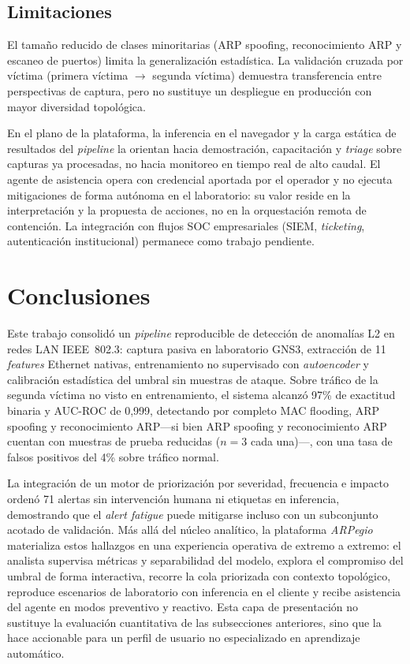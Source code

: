 \documentclass[conference]{IEEEtran}
\newcommand{\arpspoof}{ARP spoofing}
\newcommand{\macflood}{MAC flooding}
\newcommand{\portscan}{escaneo de puertos}
\newcommand{\arprecon}{reconocimiento ARP}
\newcommand{\victimauno}{primera víctima}
\newcommand{\victimados}{segunda víctima}
\begin{document}
\subsection{Limitaciones}
El tamaño reducido de clases minoritarias (\arpspoof,
\arprecon{} y \portscan) limita la generalización
estadística. La validación cruzada por víctima (\victimauno{} $\to$
\victimados) demuestra transferencia entre perspectivas de captura,
pero no sustituye un despliegue en producción con mayor diversidad
topológica.

En el plano de la plataforma, la inferencia en el navegador y la carga
estática de resultados del \textit{pipeline} la orientan hacia demostración,
capacitación y \textit{triage} sobre capturas ya procesadas, no hacia
monitoreo en tiempo real de alto caudal. El agente de asistencia opera
con credencial aportada por el operador y no ejecuta mitigaciones de
forma autónoma en el laboratorio: su valor reside en la interpretación y
la propuesta de acciones, no en la orquestación remota de contención. La
integración con flujos SOC empresariales (SIEM, \textit{ticketing},
autenticación institucional) permanece como trabajo pendiente.

\section{Conclusiones}

Este trabajo consolidó un \textit{pipeline} reproducible de detección de
anomalías L2 en redes LAN IEEE~802.3: captura pasiva en laboratorio GNS3,
extracción de 11 \textit{features} Ethernet nativas, entrenamiento no
supervisado con \textit{autoencoder} y calibración estadística del umbral
sin muestras de ataque. Sobre tráfico de la \victimados{} no visto en
entrenamiento, el sistema alcanzó 97\% de exactitud binaria y AUC-ROC de
0{,}999, detectando por completo \macflood, \arpspoof{} y
\arprecon---si bien \arpspoof{} y \arprecon{}
cuentan con muestras de prueba reducidas ($n=3$ cada una)---, con una
tasa de falsos positivos del 4\% sobre tráfico normal.

La integración de un motor de priorización por severidad, frecuencia e
impacto ordenó 71 alertas sin intervención humana ni etiquetas en
inferencia, demostrando que el \textit{alert fatigue} puede mitigarse
incluso con un subconjunto acotado de validación. Más allá del núcleo
analítico, la plataforma \textit{ARPegio} materializa estos hallazgos en
una experiencia operativa de extremo a extremo: el analista supervisa
métricas y separabilidad del modelo, explora el compromiso del umbral de
forma interactiva, recorre la cola priorizada con contexto topológico,
reproduce escenarios de laboratorio con inferencia en el cliente y recibe
asistencia del agente en modos preventivo y reactivo. Esta capa de
presentación no sustituye la evaluación cuantitativa de las
subsecciones anteriores, sino que la hace accionable para un perfil de
usuario no especializado en aprendizaje automático.
\end{document}

